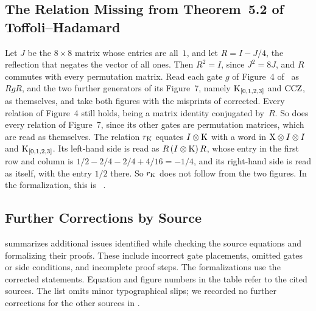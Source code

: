 \documentclass[acmsmall,screen,nonacm]{acmart}
\begin{document}
\subsection{The Relation Missing from Theorem~5.2 of Toffoli--Hadamard}\label{app:corr-rk}

Let $J$ be the $8\times8$ matrix whose entries are all~$1$, and let $R=I-J/4$, the reflection that negates the vector of all ones. Then $R^2=I$, since $J^2=8J$, and $R$ commutes with every permutation matrix. Read each gate $g$ of Figure~4 of~\cite{amy2024toffoli} as $RgR$, and the two further generators of its Figure~7, namely $\mathrm{K}_{[0,1,2,3]}$ and $\mathrm{CCZ}$, as themselves, and take both figures with the misprints of  corrected. Every relation of Figure~4 still holds, being a matrix identity conjugated by~$R$. So does every relation of Figure~7, since its other gates are permutation matrices, which are read as themselves. The relation $r_{\mathrm{K}}$ equates $I\otimes\mathrm{K}$ with a word in $\mathrm{X}\otimes I\otimes I$ and $\mathrm{K}_{[0,1,2,3]}$. Its left-hand side is read as $R\,(I\otimes\mathrm{K})\,R$, whose entry in the first row and column is $1/2-2/4-2/4+4/16=-1/4$, and its right-hand side is read as itself, with the entry $1/2$ there. So $r_{\mathrm{K}}$ does not follow from the two figures. In the formalization, this is ~\cite{equacert2026artifact}.

\subsection{Further Corrections by Source}\label{app:corr-list}

 summarizes additional issues identified while checking
the source equations and formalizing their proofs. These include
incorrect gate placements, omitted gates or side conditions, and
incomplete proof steps. The formalizations use the corrected
statements. Equation and figure numbers in the table refer to the
cited sources. The list omits minor typographical slips; we recorded
no further corrections for the other sources in .
\end{document}

